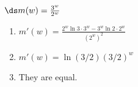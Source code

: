 {$\ds m(w) = \frac{3^w}{2^w}$
}
{\begin{enumerate}
\item $m'(w)= \frac{2^w \ln 3 \cdot 3^w - 3^w \ln 2 \cdot 2^w}{(2^w)^2}$
\item $m'(w) = \ln (3/2) (3/2)^w$
\item They are equal.
\end{enumerate}
}
